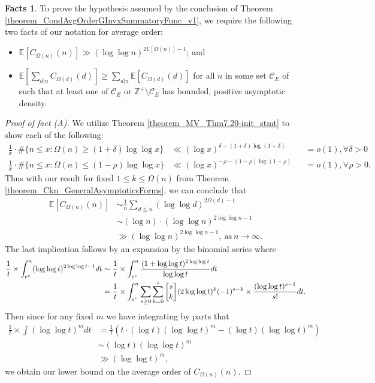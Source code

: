 \documentclass[11pt,reqno,a4letter]{article}
\numberwithin{figure}{section}
\numberwithin{table}{section}
\newcommand{\gkpSI}[2]{\ensuremath{\genfrac{\lbrack}{\rbrack}{0pt}{}{#1}{#2}}}
\theoremstyle{plain}
\numberwithin{theorem}{section}
\theoremstyle{definition}
\newtheorem{facts}[theorem]{Facts}
\begin{document}
\begin{facts} 
To prove the hypothesis assumed by the conclusion of 
Theorem \ref{theorem_CondAvgOrderGInvxSummatoryFunc_v1}, 
we require the following two facts of our notation for average order: 
\begin{itemize} 
     \item[\textbf{(A)}] $\mathbb{E}[C_{\Omega(n)}(n)] \gg (\log\log n)^{2\mathbb{E}[\Omega(n)]-1}$; and 
     \item[\textbf{(B)}] $\mathbb{E}\left[\sum_{d|n} C_{\Omega(d)}(d)\right] \geq \sum_{d|n} \mathbb{E}[C_{\Omega(d)}(d)]$ 
     for all $n$ in some set $\mathcal{C}_E$ of such that at least one of 
     $\mathcal{C}_E$ or $\mathbb{Z}^{+} \setminus \mathcal{C}_E$ has 
     bounded, positive asymptotic density. 
\end{itemize} 
\end{facts} 

\begin{proof}[Proof of fact (A)] 
We utilize Theorem \ref{theorem_MV_Thm7.20-init_stmt} 
to show each of the following: 
\begin{align*} 
\frac{1}{x} \cdot \#\{n \leq x: \Omega(n) \geq (1+\delta) \log\log x\} & \ll (\log x)^{\delta - (1+\delta)\log(1+\delta)} 
     && = o(1), \forall \delta > 0 \\ 
\frac{1}{x} \cdot \#\{n \leq x: \Omega(n) \leq (1-\rho) \log\log x\} & \ll (\log x)^{-\rho - (1-\rho)\log(1-\rho)} 
     && = o(1), \forall \rho > 0.   
\end{align*} 
Thus with our result for fixed $1 \leq k \leq \Omega(n)$ from 
Theorem \ref{theorem_Ckn_GeneralAsymptoticsForms}, 
we can conclude that 
\begin{align*} 
\mathbb{E}[C_{\Omega(n)}(n)] & \sim \frac{1}{n} \sum_{d \leq n} (\log\log d)^{2\Omega(d)-1} \\ 
     & \sim (\log n) \cdot (\log\log n)^{2\log\log n - 1} \\ 
     & \gg (\log\log n)^{2\log\log n - 1}, \mathrm{\ as\ } n \rightarrow \infty. 
\end{align*} 
The last implication follows by an expansion by the binomial series where 
\begin{align*} 
\frac{1}{t} \times \int_{e^e}^{n} (\log\log t)^{2\log\log t - 1} dt & \sim 
     \frac{1}{t} \times \int_{e^e}^{n} \frac{(1 + \log\log t)^{2\log\log t}}{\log\log t} dt \\ 
     & = \frac{1}{t} \times \int_{e^e}^{n} 
     \sum_{s \geq 0} \sum_{k=0}^{s} \gkpSI{s}{k} (2\log\log t)^{k} (-1)^{s-k} \times 
     \frac{(\log\log t)^{s-1}}{s!} dt. 
\end{align*} 
Then since for any fixed $m$ we have integrating by parts that 
\begin{align*} 
\frac{1}{t} \times \int (\log\log t)^m dt & = \frac{1}{t}\left( 
     t \cdot (\log t) (\log\log t)^m - (\log t) (\log\log t)^m\right) \\ 
     & \sim (\log t) (\log\log t)^m \\ 
     & \gg (\log\log t)^m, 
\end{align*} 
we obtain our lower bound on the average order of $C_{\Omega(n)}(n)$. 
\end{proof} 
\end{document}
